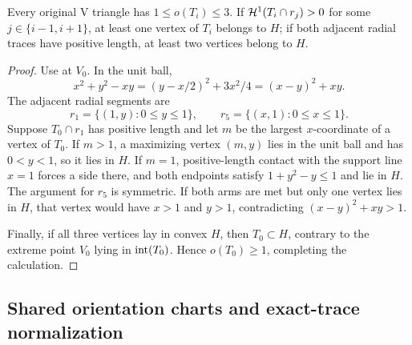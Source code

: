 \begin{lemma}
\label{lem:local-wedge}
\label{lem:app-local-wedge-calculation}

Every original V triangle has $1\le o(T_i)\le3$.  If
$\mathcal H^1(T_i\cap r_j)>0$ for some $j\in\{i-1,i+1\}$, at least one vertex of
$T_i$ belongs to $H$; if both adjacent radial traces have positive length,
at least two vertices belong to $H$.
\end{lemma}
\begin{proof}
Use  at $V_0$. In the unit ball,
\[
 x^2+y^2-xy=(y-x/2)^2+3x^2/4=(x-y)^2+xy.
\]
The adjacent radial segments are
\[
 r_1=\{(1,y):0\le y\le1\},\qquad
 r_5=\{(x,1):0\le x\le1\}.
\]
Suppose $T_0\cap r_1$ has positive length and let $m$ be the largest
$x$-coordinate of a vertex of $T_0$.  If $m>1$, a maximizing vertex $(m,y)$
lies in the unit ball and has $0<y<1$, so it lies in $H$.  If $m=1$,
positive-length contact with the support line $x=1$ forces a side there, and
both endpoints satisfy $1+y^2-y\le1$ and lie in $H$.  The argument for
$r_5$ is symmetric.  If both arms are met but only one vertex lies in $H$,
that vertex would have $x>1$ and $y>1$, contradicting
$(x-y)^2+xy>1$.

Finally, if all three vertices lay in convex $H$, then $T_0\subset H$,
contrary to the extreme point $V_0$ lying in $\mathrm{int}(T_0)$.  Hence
$o(T_0)\ge1$, completing the calculation.
\end{proof}

\subsection{Shared orientation charts and exact-trace normalization}
\label{subsec:app-exact-trace-normalization}

